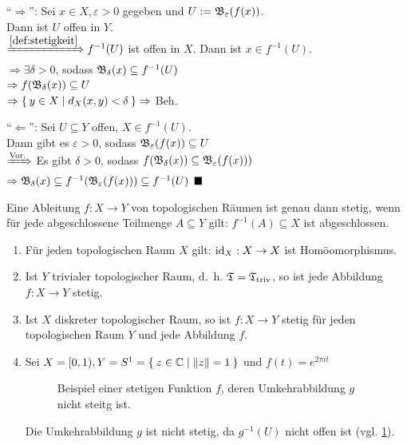\begin{beweis}
    \enquote{$\Rightarrow$}: Sei $x \in X, \varepsilon > 0$ gegeben
    und $U := \mathfrak{B}_\varepsilon(f(x))$.\\
    Dann ist $U$ offen in $Y$.\\
    $\xRightarrow{\ref{def:stetigkeit}} f^{-1}(U)$  ist 
    offen in $X$. Dann ist $x \in f^{-1}(U)$.\\
    $\Rightarrow \exists \delta > 0$, sodass 
    $\mathfrak{B}_\delta(x) \subseteq f^{-1} (U)$\\
    $\Rightarrow f(\mathfrak{B}_\delta(x)) \subseteq U$\\
    $\Rightarrow \Set{y \in X | d_X(x,y) < \delta} \Rightarrow$ Beh.

    \enquote{$\Leftarrow$}: Sei $U \subseteq Y$ offen, $X \in f^{-1}(U)$.\\
    Dann gibt es $\varepsilon > 0$, sodass $\mathfrak{B}_\varepsilon(f(x)) \subseteq U$\\
    $\xRightarrow{\text{Vor.}}$ Es gibt $\delta > 0$, sodass
    $f(\mathfrak{B}_\delta(x)) \subseteq \mathfrak{B}_\varepsilon (f(x)))$\\
    $\Rightarrow \mathfrak{B}_\delta(x) \subseteq f^{-1}(\mathfrak{B}_\varepsilon(f(x))) \subseteq f^{-1}(U)$
    $\qed$
\end{beweis}

\begin{bemerkung}
    Eine Ableitung $f: X \rightarrow Y$ von topologischen Räumen ist
    genau dann stetig, wenn für jede abgeschlossene Teilmenge $A \subseteq Y$
    gilt: $f^{-1}(A) \subseteq X$ ist abgeschlossen.
\end{bemerkung}

\begin{beispiel}
    \begin{enumerate}[label=\arabic*)]
        \item Für jeden topologischen Raum $X$ gilt: $\textnormal{id}_X : X \rightarrow X$
              ist Homöomorphismus.
        \item Ist $Y$ trivialer topologischer Raum, d.~h. $\mathfrak{T} = \mathfrak{T}_\text{triv}$,
              so ist jede Abbildung $f:X \rightarrow Y$ stetig.
        \item Ist $X$ diskreter topologischer Raum, so ist $f:X \rightarrow Y$
              stetig für jeden topologischen Raum $Y$ und jede Abbildung $f$.
        \item Sei $X = [0, 1), Y = S^1 = \Set{z \in \ensuremath{\mathbb{C}}| \|z\| = 1}$
              und $f(t) = e^{2 \pi i t}$
              \begin{figure}
                \centering
                
                \caption{Beispiel einer stetigen Funktion $f$, deren 
                         Umkehrabbildung $g$ nicht steitg ist.}
                \label{fig:nicht-stetige-umkehrabbildung}
              \end{figure}
              Die Umkehrabbildung $g$ ist nicht stetig, da $g^{-1}(U)$
              nicht offen ist (vgl. \cref{fig:nicht-stetige-umkehrabbildung}).
    \end{enumerate}
\end{beispiel}

